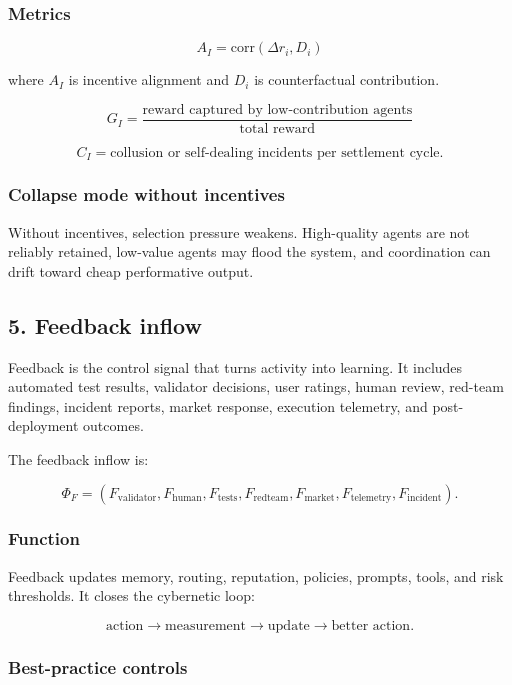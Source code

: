 \documentclass[11pt]{article}
\begin{document}
\subsubsection{Metrics}\label{metrics-3}

\[
A_I=\text{corr}(\Delta r_i,D_i)
\]

where \(A_I\) is incentive alignment and \(D_i\) is counterfactual
contribution.

\[
G_I=\frac{\text{reward captured by low-contribution agents}}{\text{total reward}}
\]

\[
C_I=\text{collusion or self-dealing incidents per settlement cycle}.
\]

\subsubsection{Collapse mode without
incentives}\label{collapse-mode-without-incentives}

Without incentives, selection pressure weakens. High-quality agents are
not reliably retained, low-value agents may flood the system, and
coordination can drift toward cheap performative output.

\subsection{5. Feedback inflow}\label{feedback-inflow}

Feedback is the control signal that turns activity into learning. It
includes automated test results, validator decisions, user ratings,
human review, red-team findings, incident reports, market response,
execution telemetry, and post-deployment outcomes.

The feedback inflow is:

\[
\Phi_F=(F_{\text{validator}},F_{\text{human}},F_{\text{tests}},F_{\text{redteam}},F_{\text{market}},F_{\text{telemetry}},F_{\text{incident}}).
\]

\subsubsection{Function}\label{function-4}

Feedback updates memory, routing, reputation, policies, prompts, tools,
and risk thresholds. It closes the cybernetic loop:

\[
\text{action}\rightarrow\text{measurement}\rightarrow\text{update}\rightarrow\text{better action}.
\]

\subsubsection{Best-practice controls}\label{best-practice-controls-4}
\end{document}
